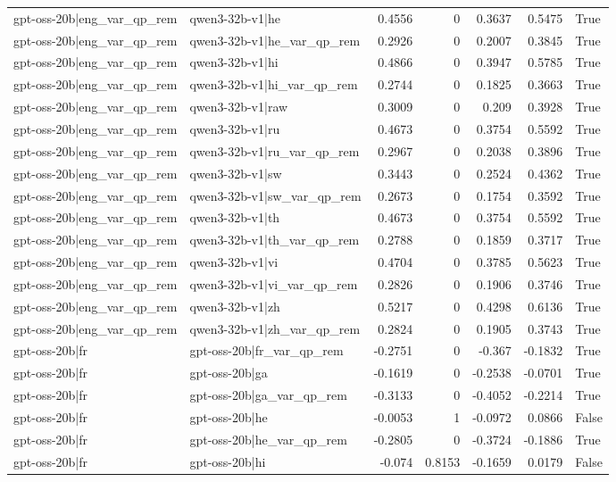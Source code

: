 \begin{table}
\begin{tabular}{l l r r r r l}
gpt-oss-20b|eng_var_qp_rem & qwen3-32b-v1|he & 0.4556 & 0 & 0.3637 & 0.5475 & True \\
gpt-oss-20b|eng_var_qp_rem & qwen3-32b-v1|he_var_qp_rem & 0.2926 & 0 & 0.2007 & 0.3845 & True \\
gpt-oss-20b|eng_var_qp_rem & qwen3-32b-v1|hi & 0.4866 & 0 & 0.3947 & 0.5785 & True \\
gpt-oss-20b|eng_var_qp_rem & qwen3-32b-v1|hi_var_qp_rem & 0.2744 & 0 & 0.1825 & 0.3663 & True \\
gpt-oss-20b|eng_var_qp_rem & qwen3-32b-v1|raw & 0.3009 & 0 & 0.209 & 0.3928 & True \\
gpt-oss-20b|eng_var_qp_rem & qwen3-32b-v1|ru & 0.4673 & 0 & 0.3754 & 0.5592 & True \\
gpt-oss-20b|eng_var_qp_rem & qwen3-32b-v1|ru_var_qp_rem & 0.2967 & 0 & 0.2038 & 0.3896 & True \\
gpt-oss-20b|eng_var_qp_rem & qwen3-32b-v1|sw & 0.3443 & 0 & 0.2524 & 0.4362 & True \\
gpt-oss-20b|eng_var_qp_rem & qwen3-32b-v1|sw_var_qp_rem & 0.2673 & 0 & 0.1754 & 0.3592 & True \\
gpt-oss-20b|eng_var_qp_rem & qwen3-32b-v1|th & 0.4673 & 0 & 0.3754 & 0.5592 & True \\
gpt-oss-20b|eng_var_qp_rem & qwen3-32b-v1|th_var_qp_rem & 0.2788 & 0 & 0.1859 & 0.3717 & True \\
gpt-oss-20b|eng_var_qp_rem & qwen3-32b-v1|vi & 0.4704 & 0 & 0.3785 & 0.5623 & True \\
gpt-oss-20b|eng_var_qp_rem & qwen3-32b-v1|vi_var_qp_rem & 0.2826 & 0 & 0.1906 & 0.3746 & True \\
gpt-oss-20b|eng_var_qp_rem & qwen3-32b-v1|zh & 0.5217 & 0 & 0.4298 & 0.6136 & True \\
gpt-oss-20b|eng_var_qp_rem & qwen3-32b-v1|zh_var_qp_rem & 0.2824 & 0 & 0.1905 & 0.3743 & True \\
gpt-oss-20b|fr & gpt-oss-20b|fr_var_qp_rem & -0.2751 & 0 & -0.367 & -0.1832 & True \\
gpt-oss-20b|fr & gpt-oss-20b|ga & -0.1619 & 0 & -0.2538 & -0.0701 & True \\
gpt-oss-20b|fr & gpt-oss-20b|ga_var_qp_rem & -0.3133 & 0 & -0.4052 & -0.2214 & True \\
gpt-oss-20b|fr & gpt-oss-20b|he & -0.0053 & 1 & -0.0972 & 0.0866 & False \\
gpt-oss-20b|fr & gpt-oss-20b|he_var_qp_rem & -0.2805 & 0 & -0.3724 & -0.1886 & True \\
gpt-oss-20b|fr & gpt-oss-20b|hi & -0.074 & 0.8153 & -0.1659 & 0.0179 & False \\

\end{tabular}
\end{table}
